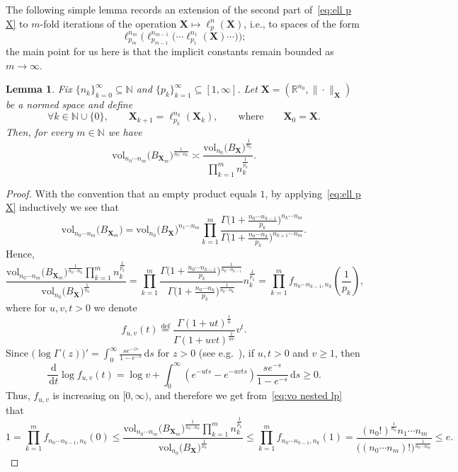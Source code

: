 \documentclass[11pt,reqno]{amsart}
\renewcommand{\le}{\leqslant}
\renewcommand{\ge}{\geqslant}
\newcommand{\ud}[0]{\,\mathrm{d}}
\newcommand{\X}{\mathbf X}
\newcommand{\R}{\mathbb R}
\newtheorem{lemma}[theorem]{Lemma}
\theoremstyle{remark}
\renewcommand{\subset}{\subseteq}
\newcommand{\N}{\mathbb N}
\newcommand{\eqdef}{\stackrel{\mathrm{def}}{=}}
\newcommand{\vol}{\mathrm{vol}}
\renewcommand{\1}{\mathbf 1}
\begin{document}
The following simple lemma records an extension of the second part of~\eqref{eq:ell p X} to $m$-fold iterations of the operation $\X\mapsto \ell_p^n(\X)$, i.e., to spaces of the form  $$\ell_{p_m}^{n_m}\Big(\ell_{p_{m-1}}^{n_{m-1}}\big(\cdots\ell_{p_1}^{n_1}(\X )\cdots \big)\Big);$$ the main point for us  here is that the implicit constants remain bounded as $m\to \infty$.


\begin{lemma}\label{lem:volume radius of nested} Fix $\{n_k\}_{k=0}^\infty\subset  \N$ and $\{p_k\}_{k=1}^\infty\subset [1,\infty]$. Let $\X=(\R^{n_0},\|\cdot\|_\X)$ be a normed space and define
$$
\forall k\in \N\cup\{0\}, \qquad \X_{k+1}=\ell_{p_k}^{n_k}(\X_k), \qquad\mathrm{where}\qquad \X_0=\X.
$$
Then, for every $m\in \N$ we have
$$
\vol_{n_0\cdots n_m}\big(B_{\X_m}\big)^{\frac{1}{n_0\cdots n_k}}\asymp \frac{\vol_{n_0}\big(B_\X\big)^{\frac{1}{n_0}}}{\prod_{k=1}^m n_k^{\frac{1}{p_k}}}.
$$
\end{lemma}

\begin{proof} With the convention that an empty product equals $1$, by applying~\eqref{eq:ell p X} inductively we see that
$$
 \vol_{n_0\cdots n_m}\big(B_{\X_m}\big)=\vol_{n_0}\big(B_\X\big)^{n_1\cdots n_m}\prod_{k=1}^m \frac{\Gamma\big(1+\frac{n_0\cdots n_{k-1}}{p_k}\big)^{n_k\cdots n_m}}{\Gamma\big(1+\frac{n_0\cdots n_{k}}{p_k}\big)^{n_{k+1}\cdots n_m}}.
$$
Hence,
\begin{equation}\label{eq:vo nested lp}
\frac{\vol_{n_0\cdots n_m}\big(B_{\X_m}\big)^{\frac{1}{n_0\cdots n_k}}\prod_{k=1}^m n_k^{\frac{1}{p_k}}}{\vol_{n_0}\big(B_\X\big)^{\frac{1}{n_0}}}=\prod_{k=1}^m \frac{\Gamma\big(1+\frac{n_0\cdots n_{k-1}}{p_k}\big)^{\frac{1}{n_0\cdots n_{k-1}}}}{\Gamma\big(1+\frac{n_0\cdots n_{k}}{p_k}\big)^{\frac{1}{n_{0}\cdots n_k}}}n_k^{\frac{1}{p_k}}=\prod_{k=1}^m f_{n_0\cdots n_{k-1},n_k}\left(\frac{1}{p_k}\right),
\end{equation}
where for  $u,v,t>0$ we denote
$$
f_{u,v}(t)\eqdef \frac{\Gamma(1+ut)^{\frac{1}{u}}}{\Gamma(1+uvt)^{\frac{1}{uv}}}v^t.
$$
Since $\big(\log \Gamma(z)\big)'=\int_0^\infty \frac{se^{-zs}}{1-e^{-s}}\ud s$ for $z>0$  (see e.g.~\cite[Chapter~XII]{WW62}), if $u,t>0$ and $v\ge1$, then
$$
\frac{\ud}{\ud t} \log f_{u,v}(t)=\log v+\int_0^\infty \left(e^{-uts}-e^{-uvts}\right)\frac{s e^{-s}}{1-e^{-s}}\ud s\ge 0.
$$
Thus, $f_{u,v}$ is increasing on $[0,\infty)$, and therefore we get from~\eqref{eq:vo nested lp} that
\begin{equation*}
1=\prod_{k=1}^m f_{n_0\cdots n_{k-1},n_k}(0)\le \frac{\vol_{n_0\cdots n_m}\big(B_{\X_m}\big)^{\frac{1}{n_0\cdots n_k}}\prod_{k=1}^m n_k^{\frac{1}{p_k}}}{\vol_{n_0}\big(B_\X\big)^{\frac{1}{n_0}}}\le \prod_{k=1}^m f_{n_0\cdots n_{k-1},n_k}(1)=\frac{(n_0!)^{\frac{1}{n_0}}n_1\cdots n_m}{\big((n_0\cdots n_m)!\big)^{\frac{1}{n_0\cdots n_m}}}\le e.\tag*{\qedhere}
\end{equation*}
\end{proof}
\end{document}

